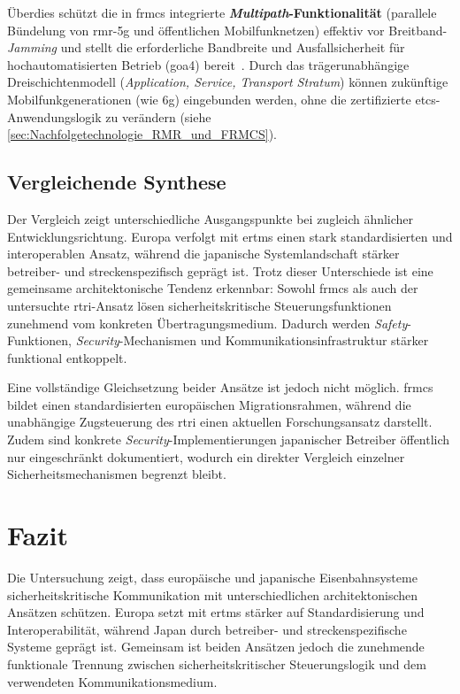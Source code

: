 \documentclass[runningheads]{res/llncs}
\begin{document}
Überdies schützt die in \gls{frmcs} integrierte \textbf{\textit{Multipath}-Funktionalität} (parallele Bündelung von \gls{rmr}-\gls{5g} und öffentlichen Mobilfunknetzen) effektiv vor Breitband-\textit{Jamming} und stellt die erforderliche Bandbreite und Ausfallsicherheit für hochautomatisierten Betrieb (\gls{goa4}) bereit~\parencite[S. 123, 211]{trinckaufETCS2024}. Durch das trägerunabhängige Dreischichtenmodell (\textit{Application, Service, Transport Stratum}) können zukünftige Mobilfunkgenerationen (wie \gls{6g}) eingebunden werden, ohne die zertifizierte \gls{etcs}-Anwendungslogik zu verändern (siehe \autoref{sec:Nachfolgetechnologie_RMR_und_FRMCS}).

\subsection{Vergleichende Synthese}
\label{sec:Vergleichende_Synthese}

Der Vergleich zeigt unterschiedliche Ausgangspunkte bei zugleich ähnlicher Entwicklungsrichtung. Europa verfolgt mit \gls{ertms} einen stark standardisierten und interoperablen Ansatz, während die japanische Systemlandschaft stärker betreiber- und streckenspezifisch geprägt ist. Trotz dieser Unterschiede ist eine gemeinsame architektonische Tendenz erkennbar: Sowohl \gls{frmcs} als auch der untersuchte \gls{rtri}-Ansatz lösen sicherheitskritische Steuerungsfunktionen zunehmend vom konkreten Übertragungsmedium. Dadurch werden \textit{Safety}-Funktionen, \textit{Security}-Mechanismen und Kommunikationsinfrastruktur stärker funktional entkoppelt.

Eine vollständige Gleichsetzung beider Ansätze ist jedoch nicht möglich. \gls{frmcs} bildet einen standardisierten europäischen Migrationsrahmen, während die unabhängige Zugsteuerung des \gls{rtri} einen aktuellen Forschungsansatz darstellt. Zudem sind konkrete \textit{Security}-Implementierungen japanischer Betreiber öffentlich nur eingeschränkt dokumentiert, wodurch ein direkter Vergleich einzelner Sicherheitsmechanismen begrenzt bleibt.

\section{Fazit}
\label{sec:Fazit}

Die Untersuchung zeigt, dass europäische und japanische Eisenbahnsysteme sicherheitskritische Kommunikation mit unterschiedlichen architektonischen Ansätzen schützen. Europa setzt mit \gls{ertms} stärker auf Standardisierung und Interoperabilität, während Japan durch betreiber- und streckenspezifische Systeme geprägt ist. Gemeinsam ist beiden Ansätzen jedoch die zunehmende funktionale Trennung zwischen sicherheitskritischer Steuerungslogik und dem verwendeten Kommunikationsmedium.
\end{document}

